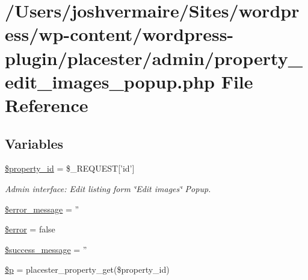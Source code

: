 \hypertarget{property__edit__images__popup_8php}{
\section{/Users/joshvermaire/Sites/wordpress/wp-\/content/wordpress-\/plugin/placester/admin/property\_\-edit\_\-images\_\-popup.php File Reference}
\label{dd/d5d/property__edit__images__popup_8php}
}
\subsection*{Variables}
\begin{DoxyCompactItemize}
\item 
\hyperlink{property__edit__images__popup_8php_a88c3dc31d5eb48b33b9ed5cfe1ffd62f}{\$property\_\-id} = \$\_\-REQUEST\mbox{[}'id'\mbox{]}
\begin{DoxyCompactList}\small\item\em Admin interface: Edit listing form \char`\"{}Edit images\char`\"{} Popup. \end{DoxyCompactList}\item 
\hyperlink{property__edit__images__popup_8php_ae838cbd355959defbd4d49d0fbe7b273}{\$error\_\-message} = ''
\item 
\hyperlink{property__edit__images__popup_8php_aeba2ab722cedda53dbb7ec1a59f45550}{\$error} = false
\item 
\hyperlink{property__edit__images__popup_8php_a67b1d5f0f420d410d3b5f8207158d272}{\$success\_\-message} = ''
\item 
\hyperlink{property__edit__images__popup_8php_ab0ed46ece3f8d301125a0f2728d90d7b}{\$p} = placester\_\-property\_\-get(\$property\_\-id)
\end{DoxyCompactItemize}


